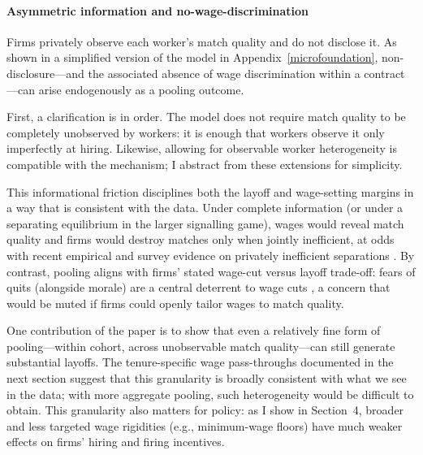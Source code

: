 \paragraph{Asymmetric information and no-wage-discrimination}
Firms privately observe each worker’s match quality and do not disclose it. As shown in a simplified version of the model in Appendix~\ref{microfoundation}, non-disclosure—and the associated absence of wage discrimination within a contract—can arise endogenously as a pooling outcome.

First, a clarification is in order. The model does not require match quality to be completely unobserved by workers: it is enough that workers observe it only imperfectly at hiring. Likewise, allowing for observable worker heterogeneity is compatible with the mechanism; I abstract from these extensions for simplicity.

This informational friction disciplines both the layoff and wage-setting margins in a way that is consistent with the data. Under complete information (or under a separating equilibrium in the larger signalling game), wages would reveal match quality and firms would destroy matches only when jointly inefficient, at odds with recent empirical and survey evidence on privately inefficient separations \parencite[]{jager2022,davis2025}. By contrast, pooling aligns with firms’ stated wage-cut versus layoff trade-off: fears of quits (alongside morale) are a central deterrent to wage cuts \parencite{bertheau2025}, a concern that would be muted if firms could openly tailor wages to match quality. 

One contribution of the paper is to show that even a relatively fine form of pooling---within cohort, across unobservable match quality---can still generate substantial layoffs. The tenure-specific wage pass-throughs documented in the next section suggest that this granularity is broadly consistent with what we see in the data; with more aggregate pooling, such heterogeneity would be difficult to obtain. This granularity also matters for policy: as I show in Section~4, broader and less targeted wage rigidities (e.g., minimum-wage floors) have much weaker effects on firms' hiring and firing incentives.


 


